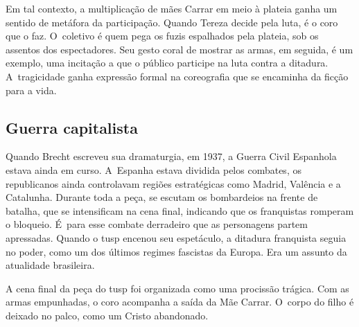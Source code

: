 {

Em tal contexto, a multiplicação de mães Carrar em meio à plateia
ganha um sentido de metáfora da participação. Quando Tereza decide pela
luta, é o coro que o faz. O~coletivo é quem pega os fuzis espalhados
pela plateia, sob os assentos dos espectadores. Seu gesto coral de
mostrar as armas, em seguida, é um exemplo, uma incitação a que o
público participe na luta contra a ditadura. A~tragicidade ganha
expressão formal na coreografia que se encaminha da ficção para a vida.


\subsection{Guerra capitalista}

Quando Brecht escreveu sua dramaturgia, em 1937, a Guerra Civil
Espanhola estava ainda em curso. A~Espanha estava dividida pelos
combates, os republicanos ainda controlavam regiões estratégicas como
Madrid, Valência e a Catalunha. Durante toda a peça, se escutam os
bombardeios na frente de batalha, que se intensificam na cena final,
indicando que os franquistas romperam o bloqueio. É~para esse combate
derradeiro que as personagens partem apressadas. Quando o {\sc tusp} encenou
seu espetáculo, a ditadura franquista
seguia no poder, como um dos últimos regimes fascistas da Europa. Era um
assunto da atualidade brasileira.

A cena final da peça do {\sc tusp} foi organizada como uma procissão
trágica. Com as armas empunhadas, o coro acompanha a saída da Mãe
Carrar. O~corpo do filho é deixado no palco, como um Cristo abandonado.

}
